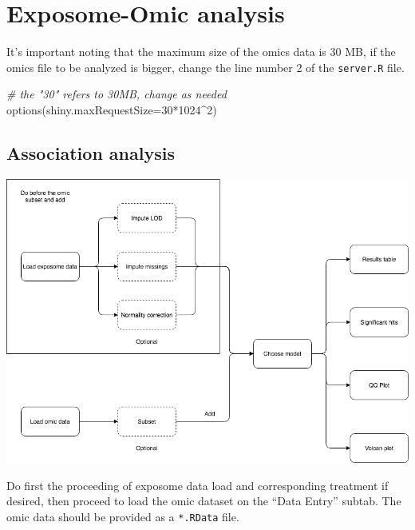 \documentclass[
]{book}
\newenvironment{Shaded}{\begin{snugshade}}{\end{snugshade}}
\newcommand{\AttributeTok}[1]{\textcolor[rgb]{0.77,0.63,0.00}{#1}}
\newcommand{\CommentTok}[1]{\textcolor[rgb]{0.56,0.35,0.01}{\textit{#1}}}
\newcommand{\DecValTok}[1]{\textcolor[rgb]{0.00,0.00,0.81}{#1}}
\newcommand{\FunctionTok}[1]{\textcolor[rgb]{0.00,0.00,0.00}{#1}}
\newcommand{\NormalTok}[1]{#1}
\newcommand{\SpecialCharTok}[1]{\textcolor[rgb]{0.00,0.00,0.00}{#1}}
\begin{document}
\hypertarget{exposome-omic-analysis}{%
\section{Exposome-Omic analysis}\label{exposome-omic-analysis}}

It's important noting that the maximum size of the omics data is 30 MB, if the omics file to be analyzed is bigger, change the line number 2 of the \texttt{server.R} file.

\begin{Shaded}
\begin{Highlighting}[]
  \CommentTok{\# the "30" refers to 30MB, change as needed}
\FunctionTok{options}\NormalTok{(}\AttributeTok{shiny.maxRequestSize=}\DecValTok{30}\SpecialCharTok{*}\DecValTok{1024}\SpecialCharTok{\^{}}\DecValTok{2}\NormalTok{)}
\end{Highlighting}
\end{Shaded}

\hypertarget{association-analysis}{%
\subsection{Association analysis}\label{association-analysis}}

\includegraphics{images/analysis9_1.png}

Do first the proceeding of exposome data load and corresponding treatment if desired, then proceed to load the omic dataset on the ``Data Entry'' subtab. The omic data should be provided as a \texttt{*.RData} file.
\end{document}
